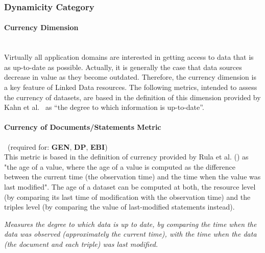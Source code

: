 \subsubsection{Dynamicity Category}
\label{sec:Dynamicity} 

\paragraph{Currency Dimension}~\\ %
Virtually all application domains are interested in getting access to data that is as up-to-date as possible. Actually, it is generally the case that data sources decrease in value as they become outdated. Therefore, the currency dimension is a key feature of Linked Data resources. The following metrics, intended to assess the currency of datasets, are based in the definition of this dimension provided by Kahn et al.~\cite{Kahn2002} as ``the degree to which information is up-to-date''.

\paragraph{Currency of Documents/Statements Metric}~(required for: \textbf{GEN}, \textbf{DP}, \textbf{EBI})~\\ %
This metric is based in the definition of currency provided by Rula et al. (\cite{Rula2012}) as "the age of a value, where the age of a value is computed as the difference between the current time (the observation time) and the time when the value was last modified". The age of a dataset can be computed at both, the resource level (by comparing its last time of modification with the observation time) and the triples level (by comparing the value of last-modified statements instead).
\begin{mdframed}[style=metricdefinition]
\emph{Measures the degree to which data is up to date, by comparing the time when the data was observed (approximately the current time), with the time when the data (the document and each triple) was last modified.}
\end{mdframed}

